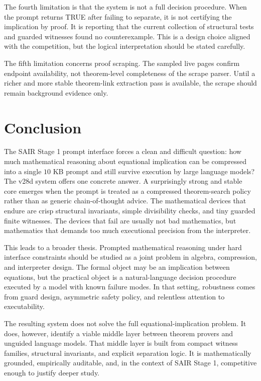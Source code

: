 \documentclass[12pt]{amsart}
\begin{document}
The fourth limitation is that the system is not a full decision procedure. When the prompt returns TRUE after failing to separate, it is not certifying the implication by proof. It is reporting that the current collection of structural tests and guarded witnesses found no counterexample. This is a design choice aligned with the competition, but the logical interpretation should be stated carefully.

The fifth limitation concerns proof scraping. The sampled live pages confirm endpoint availability, not theorem-level completeness of the scrape parser. Until a richer and more stable theorem-link extraction pass is available, the scrape should remain background evidence only.

\section{Conclusion}

The SAIR Stage 1 prompt interface forces a clean and difficult question: how much mathematical reasoning about equational implication can be compressed into a single $10$ KB prompt and still survive execution by large language models? The v28d system offers one concrete answer. A surprisingly strong and stable core emerges when the prompt is treated as a compressed theorem-search policy rather than as generic chain-of-thought advice. The mathematical devices that endure are crisp structural invariants, simple divisibility checks, and tiny guarded finite witnesses. The devices that fail are usually not bad mathematics, but mathematics that demands too much executional precision from the interpreter.

This leads to a broader thesis. Prompted mathematical reasoning under hard interface constraints should be studied as a joint problem in algebra, compression, and interpreter design. The formal object may be an implication between equations, but the practical object is a natural-language decision procedure executed by a model with known failure modes. In that setting, robustness comes from guard design, asymmetric safety policy, and relentless attention to executability.

The resulting system does not solve the full equational-implication problem. It does, however, identify a viable middle layer between theorem provers and unguided language models. That middle layer is built from compact witness families, structural invariants, and explicit separation logic. It is mathematically grounded, empirically auditable, and, in the context of SAIR Stage 1, competitive enough to justify deeper study.
\end{document}
